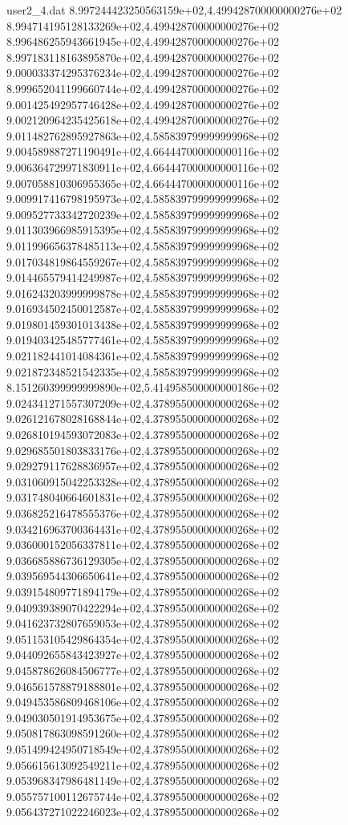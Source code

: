 \begin{filecontents}{user2_4.dat}
8.997244423250563159e+02,4.499428700000000276e+02
8.994714195128133269e+02,4.499428700000000276e+02
8.996486255943661945e+02,4.499428700000000276e+02
8.997183118163895870e+02,4.499428700000000276e+02
9.000033374295376234e+02,4.499428700000000276e+02
8.999652041199660744e+02,4.499428700000000276e+02
9.001425492957746428e+02,4.499428700000000276e+02
9.002120964235425618e+02,4.499428700000000276e+02
9.011482762895927863e+02,4.585839799999999968e+02
9.004589887271190491e+02,4.664447000000000116e+02
9.006364729971830911e+02,4.664447000000000116e+02
9.007058810306955365e+02,4.664447000000000116e+02
9.009917416798195973e+02,4.585839799999999968e+02
9.009527733342720239e+02,4.585839799999999968e+02
9.011303966985915395e+02,4.585839799999999968e+02
9.011996656378485113e+02,4.585839799999999968e+02
9.017034819864559267e+02,4.585839799999999968e+02
9.014465579414249987e+02,4.585839799999999968e+02
9.016243203999999878e+02,4.585839799999999968e+02
9.016934502450012587e+02,4.585839799999999968e+02
9.019801459301013438e+02,4.585839799999999968e+02
9.019403425485777461e+02,4.585839799999999968e+02
9.021182441014084361e+02,4.585839799999999968e+02
9.021872348521542335e+02,4.585839799999999968e+02
8.151260399999999890e+02,5.414958500000000186e+02
9.024341271557307209e+02,4.378955000000000268e+02
9.026121678028168844e+02,4.378955000000000268e+02
9.026810194593072083e+02,4.378955000000000268e+02
9.029685501803833176e+02,4.378955000000000268e+02
9.029279117628836957e+02,4.378955000000000268e+02
9.031060915042253328e+02,4.378955000000000268e+02
9.031748040664601831e+02,4.378955000000000268e+02
9.036825216478555376e+02,4.378955000000000268e+02
9.034216963700364431e+02,4.378955000000000268e+02
9.036000152056337811e+02,4.378955000000000268e+02
9.036685886736129305e+02,4.378955000000000268e+02
9.039569544306650641e+02,4.378955000000000268e+02
9.039154809771894179e+02,4.378955000000000268e+02
9.040939389070422294e+02,4.378955000000000268e+02
9.041623732807659053e+02,4.378955000000000268e+02
9.051153105429864354e+02,4.378955000000000268e+02
9.044092655843423927e+02,4.378955000000000268e+02
9.045878626084506777e+02,4.378955000000000268e+02
9.046561578879188801e+02,4.378955000000000268e+02
9.049453586809468106e+02,4.378955000000000268e+02
9.049030501914953675e+02,4.378955000000000268e+02
9.050817863098591260e+02,4.378955000000000268e+02
9.051499424950718549e+02,4.378955000000000268e+02
9.056615613092549211e+02,4.378955000000000268e+02
9.053968347986481149e+02,4.378955000000000268e+02
9.055757100112675744e+02,4.378955000000000268e+02
9.056437271022246023e+02,4.378955000000000268e+02

\end{filecontents}
